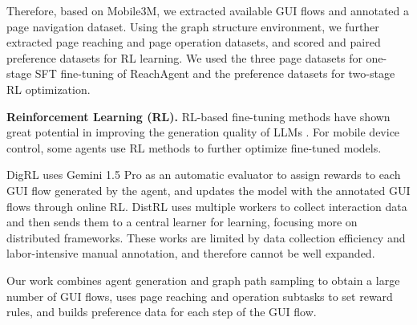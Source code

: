 Therefore, based on Mobile3M, we extracted available GUI flows and annotated a page navigation dataset. Using the graph structure environment, we further extracted page reaching and page operation datasets, and scored and paired preference datasets for RL learning. We used the three page datasets for one-stage SFT fine-tuning of ReachAgent and the preference datasets for two-stage RL optimization.


\textbf{Reinforcement Learning (RL).}
RL-based fine-tuning methods have shown great potential in improving the generation quality of LLMs \cite{liu2023rltf, shen2023pangu,yuan2023rrhf}. For mobile device control, some agents use RL methods to further optimize fine-tuned models. 

DigRL \cite{bai2024digirl} uses Gemini 1.5 Pro \cite{team2024gemini} as an automatic evaluator to assign rewards to each GUI flow generated by the agent, and updates the model with the annotated GUI flows through online RL. DistRL \cite{wang2024distrl} uses multiple workers to collect interaction data and then sends them to a central learner for learning, focusing more on distributed frameworks. These works are limited by data collection efficiency and labor-intensive manual annotation, and therefore cannot be well expanded. 

Our work combines agent generation and graph path sampling to obtain a large number of GUI flows, uses page reaching and operation subtasks to set reward rules, and builds preference data for each step of the GUI flow.